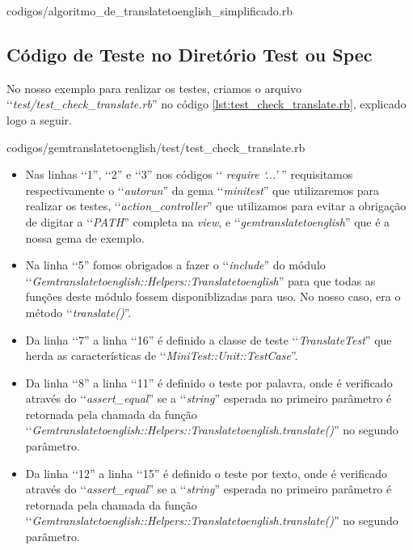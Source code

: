 
{codigos/algoritmo_de_translatetoenglish_simplificado.rb}


\subsection{Código de Teste no Diretório Test ou Spec}
\label{subsection:codigo_de_teste_no_diretorio_test_ou_spec}


No nosso exemplo para realizar os testes, criamos o arquivo ‘‘\emph{test/test\_check\_translate.rb}'' no código
\ref{lst:test_check_translate.rb}, explicado logo a seguir.


{codigos/gemtranslatetoenglish/test/test_check_translate.rb}

\begin{itemize}

 \item Nas linhas ‘‘1'', ‘‘2'' e ‘‘3'' nos códigos ‘‘ \emph{require ‘...'} '' requisitamos respectivamente o
 ‘‘\emph{autorun}'' da gema ‘‘\emph{minitest}'' que utilizaremos para realizar os testes,
 ‘‘\emph{action\_controller}'' que utilizamos para evitar a obrigação de digitar a ‘‘\emph{PATH}'' completa
 na \emph{view}, e ‘‘\emph{gemtranslatetoenglish}'' que é a nossa gema de exemplo.

 \item Na linha ‘‘5'' fomos obrigados a fazer o ‘‘\emph{include}'' do módulo
 ‘‘\emph{Gemtranslatetoenglish::Helpers::Translatetoenglish}'' para que todas as funções deste módulo fossem
 disponiblizadas para uso. No nosso caso, era o método ‘‘\emph{translate()}''.

 \item Da linha ‘‘7'' a linha ‘‘16'' é definido a classe de teste ‘‘\emph{TranslateTest}'' que herda as
 características de ‘‘\emph{MiniTest::Unit::TestCase}''.

 \item Da linha ‘‘8'' a linha ‘‘11'' é definido o teste por palavra, onde é verificado através do
 ‘‘\emph{assert\_equal}'' se a ‘‘\emph{string}'' esperada no primeiro parâmetro é retornada pela chamada
 da função ‘‘\emph{Gemtranslatetoenglish::Helpers::Translatetoenglish.translate()}'' no segundo parâmetro.

 \item Da linha ‘‘12'' a linha ‘‘15'' é definido o teste por texto, onde é verificado através do
 ‘‘\emph{assert\_equal}'' se a ‘‘\emph{string}'' esperada no primeiro parâmetro é retornada pela chamada
 da função ‘‘\emph{Gemtranslatetoenglish::Helpers::Translatetoenglish.translate()}'' no segundo parâmetro.

\end{itemize}


